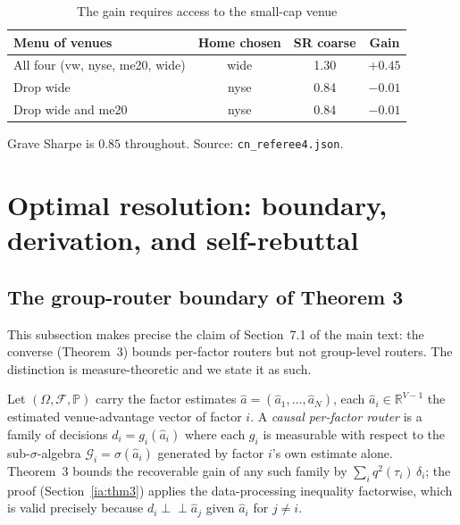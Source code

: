 \documentclass[12pt]{article}
\theoremstyle{plain}
\theoremstyle{definition}
\begin{document}
\begin{table}[t]
\centering
\caption{The gain requires access to the small-cap venue}
\label{tab:iacap}
\begin{threeparttable}
\begin{tabular}{lccc}
\toprule
Menu of venues & Home chosen & SR coarse & Gain \\
\midrule
All four (vw, nyse, me20, wide) & wide & 1.30 & $+0.45$ \\
Drop wide                       & nyse & 0.84 & $-0.01$ \\
Drop wide and me20              & nyse & 0.84 & $-0.01$ \\
\bottomrule
\end{tabular}
\begin{tablenotes}\footnotesize
\item Grave Sharpe is $0.85$ throughout. Source: \texttt{cn\_referee4.json}.
\end{tablenotes}
\end{threeparttable}
\end{table}

\clearpage
\section{Optimal resolution: boundary, derivation, and self-rebuttal}
\label{ia:kstar}

\subsection{The group-router boundary of Theorem 3}
\label{ia:boundary}

This subsection makes precise the claim of Section~7.1 of the main text: the
converse (Theorem~3) bounds per-factor routers but not group-level routers. The
distinction is measure-theoretic and we state it as such.

Let $(\Omega,\mathcal F,\mathbb P)$ carry the factor estimates
$\hat a=(\hat a_1,\dots,\hat a_N)$, each $\hat a_i\in\mathbb R^{V-1}$ the
estimated venue-advantage vector of factor $i$. A \emph{causal per-factor router}
is a family of decisions $d_i=g_i(\hat a_i)$ where each $g_i$ is measurable with
respect to the sub-$\sigma$-algebra $\mathcal G_i=\sigma(\hat a_i)$ generated by
factor $i$'s own estimate alone. Theorem~3 bounds the recoverable gain of any
such family by $\sum_i q^2(\tau_i)\,\delta_i$; the proof (Section~\ref{ia:thm3})
applies the data-processing inequality factorwise, which is valid precisely
because $d_i\perp\!\!\!\perp\hat a_j$ given $\hat a_i$ for $j\ne i$.
\end{document}
